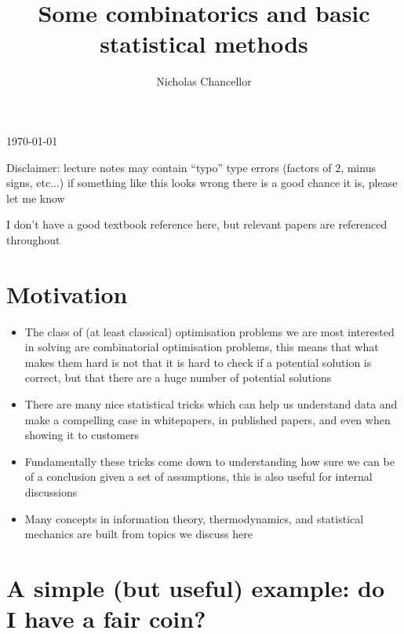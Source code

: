 \documentclass[english]{article}
\begin{document}
\title{Some combinatorics and basic statistical methods}
\author{Nicholas Chancellor}


\maketitle


\today %


{\small Disclaimer: lecture notes may contain ``typo'' type errors (factors of $2$, minus signs, etc...) if something like this looks wrong there is a good chance it is, please let me know}

I don't have a good textbook reference here, but relevant papers are referenced throughout


\section{Motivation}
\begin{itemize}
\item The class of (at least classical) optimisation problems we are most interested in solving are combinatorial optimisation problems, this means that what makes them hard is not that it is hard to check if a potential solution is correct, but that there are a huge number of potential solutions
\item There are many nice statistical tricks which can help us understand data and make a compelling case in whitepapers, in published papers, and even when showing it to customers
\item Fundamentally these tricks come down to understanding how sure we can be of a conclusion given a set of assumptions, this is also useful for internal discussions
\item Many concepts in information theory, thermodynamics, and statistical mechanics are built from topics we discuss here
\end{itemize}

\section{A simple (but useful) example: do I have a fair coin?}
\end{document}
